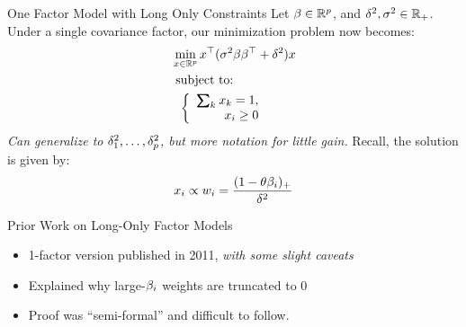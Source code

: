 \documentclass[11pt,leqno]{beamer}
\begin{document}
\begin{frame}{One Factor Model with Long Only Constraints}
Let $\beta \in \mathbb{R}^p$, and $\delta^2, \sigma^2 \in \mathbb{R}_+$.  Under a single covariance factor, our minimization problem now becomes:
\begin{equation}
\begin{aligned}
 &\min_{x \in \bbr^p} x^\top (\gs^2 \gb \gb^\T  + \gd^2)x\\
  &\text{ subject to:} \\
  &\hspace{0.08in}\left\{
	\begin{array}{r}
	 \textstyle\sum\nolimits_k \hpt x_k =1 , \\
	 x_i \geq 0
	\end{array} 
\right. \label{con1}
\end{aligned}
\end{equation}
\textit{Can generalize to $\delta_1^2, \ldots, \delta_p^2$, but more notation for little gain.}
Recall, the solution is given by:
\begin{equation}
x_i \propto w_i =\frac{(1-\theta \beta_i)_+}{\delta^2}
\end{equation}
\end{frame}


\begin{frame}{Prior Work on Long-Only Factor Models}
\begin{itemize}

\item 1-factor version  published in 2011, \textit{with some slight caveats} \cite{c31}
\item Explained why large-$\beta_i$ weights are truncated to $0$
\item Proof was ``semi-formal'' and difficult to follow.

\end{itemize}
\end{frame}
\end{document}
